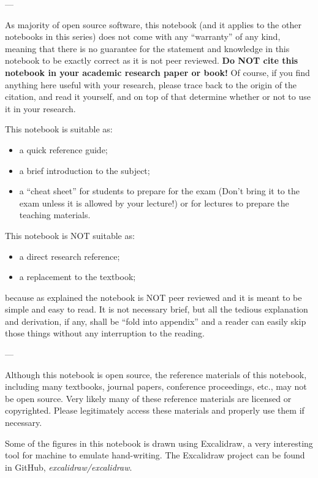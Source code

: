 \noindent ---

\noindent As majority of open source software, this notebook (and it applies to the other notebooks in this series) does not come with any ``warranty'' of any kind, meaning that there is no guarantee for the statement and knowledge in this notebook to be exactly correct as it is not peer reviewed. \textbf{Do NOT cite this notebook in your academic research paper or book!} Of course, if you find anything here useful with your research, please trace back to the origin of the citation, and read it yourself, and on top of that determine whether or not to use it in your research.

This notebook is suitable as:
\begin{itemize}
  \item a quick reference guide;
  \item a brief introduction to the subject;
  \item a ``cheat sheet'' for students to prepare for the exam (Don't bring it to the exam unless it is allowed by your lecture!) or for lectures to prepare the teaching materials.
\end{itemize}

This notebook is NOT suitable as:
\begin{itemize}
  \item a direct research reference;
  \item a replacement to the textbook;
\end{itemize}
because as explained the notebook is NOT peer reviewed and it is meant to be simple and easy to read. It is not necessary brief, but all the tedious explanation and derivation, if any, shall be ``fold into appendix'' and a reader can easily skip those things without any interruption to the reading.

\noindent ---

\noindent Although this notebook is open source, the reference materials of this notebook, including many textbooks, journal papers, conference proceedings, etc., may not be open source. Very likely many of these reference materials are licensed or copyrighted. Please legitimately access these materials and properly use them if necessary. \vadjust{\vfill\pagebreak}

\noindent Some of the figures in this notebook is drawn using Excalidraw, a very interesting tool for machine to emulate hand-writing. The Excalidraw project can be found in GitHub, \textit{excalidraw/excalidraw}.

